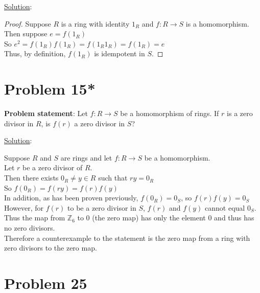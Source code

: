 \documentclass{article} %
\begin{document}
\underline{Solution}: 
\begin{addmargin}[1em]{0em}
\begin{proof} \hfill \break
Suppose $R$ is a ring with identity $1_R$ and $f:R \rightarrow S$ is a homomorphism.
\\Then suppose $e = f(1_R)$
\\So $e^2 = f(1_R)f(1_R) = f(1_R1_R) = f(1_R) = e$
\\Thus, by definition, $f(1_R)$ is idempotent in $S$.
\end{proof}
\end{addmargin}

\newpage

\section*{Problem 15*}

\textbf{Problem statement}: Let $f:R \rightarrow S$ be a homomorphism of rings.  If $r$ is a zero divisor in $R$, is $f(r)$ a zero divisor in $S$?

\underline{Solution}: 
\begin{addmargin}[1em]{0em}
Suppose $R$ and $S$ are rings and let $f:R \rightarrow S$ be a homomorphism.
\\Let $r$ be a zero divisor of $R$.
\\Then there exists $0_R \neq y \in R$ such that $ry = 0_R$
\\So $f(0_R) = f(ry) = f(r)f(y)$
\\In addition, as has been proven previously, $f(0_R) = 0_S$, so $f(r)f(y) = 0_S$
\\However, for $f(r)$ to be a zero divisor in $S$, $f(r)$ and $f(y)$ cannot equal $0_S$.
\\Thus the map from $\mathbb{Z}_6$ to $0$ (the zero map) has only the element $0$ and thus has no zero divisors.
\\Therefore a counterexample to the statement is the zero map from a ring with zero divisors to the zero map.
\end{addmargin}

\newpage

\section*{Problem 25}
\end{document}
